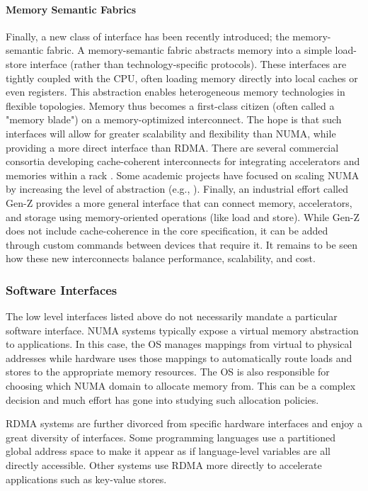 \paragraph{Memory Semantic Fabrics}
Finally, a new class of interface has been recently introduced; the
memory-semantic fabric. A memory-semantic fabric abstracts memory into a simple
load-store interface (rather than technology-specific protocols). These
interfaces are tightly coupled with the CPU, often loading memory directly into
local caches or even registers. This abstraction enables heterogeneous memory
technologies in flexible topologies. Memory thus becomes a first-class citizen
(often called a "memory blade") on a memory-optimized interconnect. The hope is
that such interfaces will allow for greater scalability and flexibility than
NUMA, while providing a more direct interface than RDMA. There are several
commercial consortia developing cache-coherent interconnects for integrating
accelerators and memories within a rack \cite{ccix}\cite{capi}. Some academic
projects have focused on scaling NUMA by increasing the level of abstraction
(e.g., \cite{sonuma}\cite{lim_disag}). Finally, an industrial effort called
Gen-Z provides a more general interface that can connect memory, accelerators,
and storage using memory-oriented operations (like load and store)\cite{genz}.
While Gen-Z does not include cache-coherence in the core specification, it can
be added through custom commands between devices that require it. It remains to
be seen how these new interconnects balance performance, scalability, and cost.

\subsubsection{Software Interfaces} The low level interfaces listed above do
not necessarily mandate a particular software interface. NUMA systems typically
expose a virtual memory abstraction to applications. In this case, the OS
manages mappings from virtual to physical addresses while hardware uses those
mappings to automatically route loads and stores to the appropriate memory
resources. The OS is also responsible for choosing which NUMA domain to
allocate memory from. This can be a complex decision and much effort has gone
into studying such allocation policies\cite{linux_numa}.

RDMA systems are further divorced from specific hardware interfaces and enjoy a
great diversity of interfaces. Some programming languages use a partitioned
global address space to make it appear as if language-level variables are all
directly accessible\cite{upc}\cite{grappa}. Other systems use RDMA more
directly to accelerate applications such as key-value
stores\cite{ramcloud}\cite{farm}.

